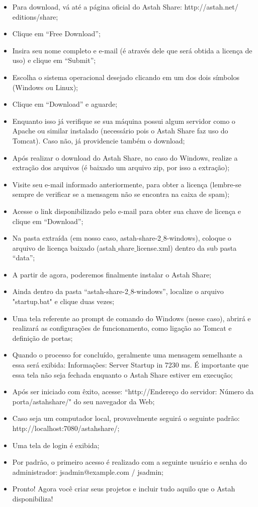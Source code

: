 \documentclass[12pt,a4paper]{article}
\begin{document}
\begin{itemize}

\item Para download, vá até a página oficial do Astah Share: http://astah.net/
editions/share;
\item Clique em “Free Download”;
\item Insira seu nome completo e e-mail (é através dele que será obtida a licença de uso) e clique em “Submit”;
\item Escolha o sistema operacional desejado clicando em um dos dois símbolos (Windows ou Linux);
\item Clique em “Download” e aguarde;
\item Enquanto isso já verifique se sua máquina possui algum servidor como o Apache ou similar instalado (necessário pois o Astah Share faz uso do Tomcat). Caso não, já providencie também o download;
\item Após realizar o download do Astah Share, no caso do Windows, realize a extração dos arquivos (é baixado um arquivo zip, por isso a extração);
\item Visite seu e-mail informado anteriormente, para obter a licença (lembre-se sempre de verificar se a mensagem não se encontra na caixa de spam);
\item Acesse o link disponibilizado pelo e-mail para obter sua chave de licença e clique em “Download”;
\item Na pasta extraída (em nosso caso, astah-share-2$\_$8-windows), coloque o 
arquivo de licença baixado (astah$\_$share$\_$license.xml) dentro da sub pasta “data”;
\item A partir de agora, poderemos finalmente instalar o Astah Share;
\item Ainda dentro da pasta “astah-share-2$\_$8-windows”, localize o arquivo "startup.bat" e clique duas vezes;
\item Uma tela referente ao prompt de comando do Windows (nesse caso), abrirá e realizará as configurações de funcionamento, como ligação ao Tomcat e definição de portas;
\item Quando o processo for concluído, geralmente uma mensagem semelhante a essa será exibida: Informações: Server Startup in 7230 ms. É importante que essa tela não seja fechada enquanto o Astah Share estiver em execução;
\item Após ser iniciado com êxito, acesse: “http://Endereço do servidor: Número da porta/astahshare/" do seu navegador da Web;
\item Caso seja um computador local, provavelmente seguirá o seguinte padrão: http://localhost:7080/astahshare/;
\item Uma tela de login é exibida;
\item Por padrão, o primeiro acesso é realizado com a seguinte usuário e senha do administrador: jsadmin@example.com / jsadmin;
\item Pronto! Agora você criar seus projetos e incluir tudo aquilo que o Astah disponibiliza!

\end{itemize}
\end{document}
